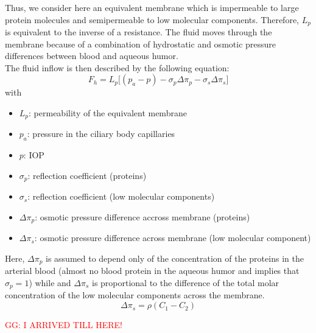 \documentclass[english,12pt]{article}
\begin{document}
Thus, we consider here an equivalent membrane which is impermeable to large protein molecules and semipermeable to low molecular components. Therefore, $L_p$ is equivalent to the inverse of a resistance. The fluid moves through the membrane because of a combination of hydrostatic and osmotic pressure differences between blood and aqueous humor.\\
The fluid inflow is then described by the following equation:
\begin{equation}
F_{h}= L_p \big[ (p_a-p)-\sigma_{p} \Delta\pi_{p}-\sigma_{s} \Delta\pi_{s}\big]
\label{e3}
\end{equation}
with
\begin{itemize}
\item $L_p$: permeability of the equivalent membrane
\item $p_a$: pressure in the ciliary body capillaries
\item $p$: IOP
\item $\sigma_p$: reflection coefficient (proteins)
\item $\sigma_s$: reflection coefficient (low molecular components)
\item $\Delta \pi_p $: osmotic pressure difference accross membrane (proteins)
\item $\Delta \pi_s $: osmotic pressure difference across membrane (low molecular component)
\end{itemize}
Here, $\Delta \pi_p $ is assumed to depend only of the concentration of the proteins in the arterial blood (almost no blood protein in the aqueous humor and implies that $\sigma_p=1$) while and $\Delta \pi_s $ is proportional to the difference of the total molar concentration of the low molecular components across the membrane.
\begin{equation}
\Delta\pi_{s}= \rho(C_1-C_{2})
\label{e4}
\end{equation}

\textcolor{red}{GG: I ARRIVED TILL HERE!}
\end{document}

